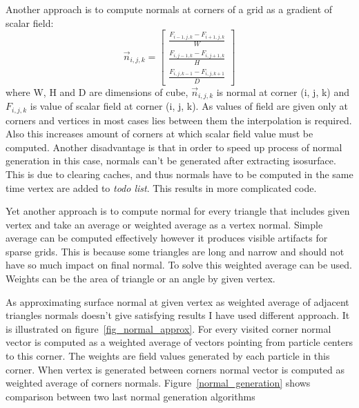 Another approach is to compute normals at corners of a grid as a gradient of scalar field: 
\begin{equation}
	\vec{n}_{i,j,k} = 
	\begin{bmatrix}
		\frac{F_{i-1, j, k} - F_{i+1, j, k}}{W}\\	
		\frac{F_{i, j-1, k} - F_{i, j+1, k}}{H}\\	
		\frac{F_{i, j, k-1} - F_{i, j, k+1}}{D}
	\end{bmatrix}
\end{equation}
where W, H and D are dimensions of cube, $\vec{n}_{i, j, k}$ is normal at corner (i, j, k) and $F_{i, j, k}$ is value of scalar field at corner (i, j, k).
As values of field are given only at corners and vertices in most cases lies between them the interpolation is required. Also this increases amount of corners at which scalar field value must be computed. Another disadvantage is that in order to speed up process of normal generation in this case, normals can't be generated after extracting isosurface. This is due to clearing caches, and thus normals have to be computed in the same time vertex are added to \textit{todo list}. This results in more complicated code.

Yet another approach is to compute normal for every triangle that includes given vertex and take an average or weighted average as a vertex normal. Simple average can be computed effectively however it produces visible artifacts for sparse grids. This is because some triangles are long and narrow and should not have so much impact on final normal. To solve this weighted average can be used. Weights can be the area of triangle or an angle by given vertex. 


As approximating surface normal at given vertex as weighted average of adjacent triangles normals doesn't give satisfying results I have used different approach. It is illustrated on figure~\ref{fig_normal_approx}. For every visited corner normal vector is computed as a weighted average of vectors pointing from particle centers to this corner. The weights are field values generated by each particle in this corner. When vertex is generated between corners normal vector is computed as weighted average of corners normals. Figure~\ref{normal_generation} shows comparison between two last normal generation algorithms

